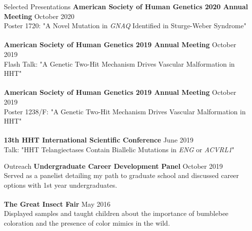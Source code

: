 \documentclass{resume} %
\begin{document}
\begin{rSection}{Selected Presentations}
{\bf American Society of Human Genetics 2020 Annual Meeting} \hfill {October 2020}\\
Poster 1720: "A Novel Mutation in \textit{GNAQ} Identified in Sturge-Weber Syndrome"\\\\
{\bf American Society of Human Genetics 2019 Annual Meeting} \hfill {October 2019}\\
Flash Talk: "A Genetic Two-Hit Mechanism Drives Vascular Malformation in HHT"\\\\
{\bf American Society of Human Genetics 2019 Annual Meeting} \hfill {October 2019}\\
Poster 1238/F: "A Genetic Two-Hit Mechanism Drives Vascular Malformation in HHT"\\\\
{\bf 13th HHT International Scientific Conference} \hfill {June 2019}\\
Talk: "HHT Telangiectases Contain Biallelic Mutations in \textit{ENG} or \textit{ACVRL1}"\\

\end{rSection}


\begin{rSection}{Outreach}
{\bf Undergraduate Career Development Panel} \hfill {October 2019}\\
Served as a panelist detailing my path to graduate school and discussed career options with 1st year undergraduates.\\\\
{\bf The Great Insect Fair} \hfill {May 2016}\\
Displayed samples and taught children about the importance of bumblebee coloration and the presence of color mimics in the wild.\\

\end{rSection}
\end{document}
